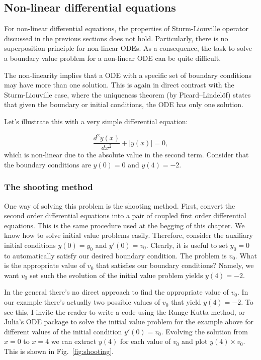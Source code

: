 \subsection{Non-linear differential equations}

For non-linear differential equations, the properties of Sturm-Liouville operator discussed in the previous sections does not hold. Particularly, there is no superposition principle for non-linear ODEs. As a consequence, the task to solve a boundary value problem for a non-linear ODE can be quite difficult.

The non-linearity implies that a ODE with a specific set of boundary conditions may have more than one solution. This is again in direct contrast with the Sturm-Liouville case, where the uniqueness theorem (by Picard–Lindelöf) states that given the boundary or initial conditions, the ODE has only one solution.

Let's illustrate this with a very simple differential equation:

\begin{equation}
 \dfrac{d^2 y(x)}{dx^2} + |y(x)| = 0,
\end{equation}
which is non-linear due to the absolute value in the second term. Consider that the boundary conditions are $y(0) = 0$ and $y(4) = -2$.

\subsubsection{The shooting method}

One way of solving this problem is the shooting method. First, convert the second order differential equations into a pair of coupled first order differential equations. This is the same procedure used at the begging of this chapter. We know how to solve initial value problems easily. Therefore, consider the auxiliary initial conditions $y(0) = y_0$ and $y'(0) = v_0$. Clearly, it is useful to set $y_0 = 0$ to automatically satisfy our desired boundary condition. The problem is $v_0$. What is the appropriate value of $v_0$ that satisfies our boundary conditions? Namely, we want $v_0$ set such the evolution of the initial value problem yields $y(4) = -2$.

In the general there's no direct approach to find the appropriate value of $v_0$. In our example there's actually two possible values of $v_0$ that yield $y(4) = -2$. To see this, I invite the reader to write a code using the Runge-Kutta method, or Julia's ODE package to solve the initial value problem for the example above for different values of the initial condition $y'(0) = v_0$. Evolving the solution from $x=0$ to $x=4$ we can extract $y(4)$ for each value of $v_0$ and plot $y(4) \times v_0$. This is shown in Fig.~\ref{fig:shooting}.


